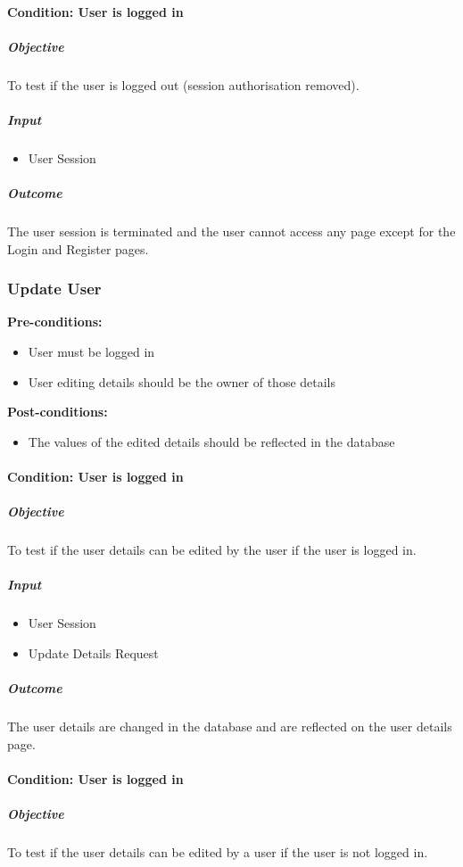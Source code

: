 \documentclass{article}
\begin{document}
			\paragraph{Condition: User is logged in}
				\subparagraph{Objective}
					To test if the user is logged out (session authorisation removed).
					
				\subparagraph{Input}
					\begin{itemize}
						\item User Session
					\end{itemize}
				
				\subparagraph{Outcome}
					The user session is terminated and the user cannot access any page except for the Login and Register pages.
					
		\subsubsection{Update User}
			\textbf{Pre-conditions:}
				\begin{itemize}
					\item User must be logged in
					\item User editing details should be the owner of those details
				\end{itemize}
			\textbf{Post-conditions:}
				\begin{itemize}
					\item The values of the edited details should be reflected in the database
				\end{itemize}
		
			\paragraph{Condition: User is logged in}
				\subparagraph{Objective}
					To test if the user details can be edited by the user if the user is logged in.
					
				\subparagraph{Input}
					\begin{itemize}
						\item User Session
						\item Update Details Request
					\end{itemize}
				
				\subparagraph{Outcome}
					The user details are changed in the database and are reflected on the user details page.
			
			\paragraph{Condition: User is logged in}
				\subparagraph{Objective}
					To test if the user details can be edited by a user if the user is not logged in.
				
\end{document}
